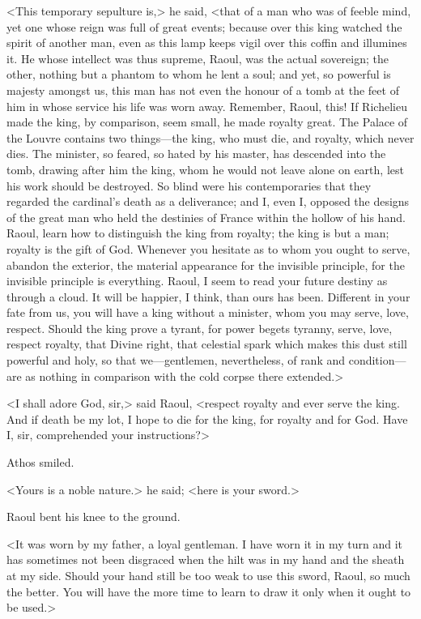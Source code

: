 <This temporary sepulture is,> he said, <that of a man who was of feeble mind, yet one whose reign was full of great events; because over this king watched the spirit of another man, even as this lamp keeps vigil over this coffin and illumines it. He whose intellect was thus supreme, Raoul, was the actual sovereign; the other, nothing but a phantom to whom he lent a soul; and yet, so powerful is majesty amongst us, this man has not even the honour of a tomb at the feet of him in whose service his life was worn away. Remember, Raoul, this! If Richelieu made the king, by comparison, seem small, he made royalty great. The Palace of the Louvre contains two things—the king, who must die, and royalty, which never dies. The minister, so feared, so hated by his master, has descended into the tomb, drawing after him the king, whom he would not leave alone on earth, lest his work should be destroyed. So blind were his contemporaries that they regarded the cardinal's death as a deliverance; and I, even I, opposed the designs of the great man who held the destinies of France within the hollow of his hand. Raoul, learn how to distinguish the king from royalty; the king is but a man; royalty is the gift of God. Whenever you hesitate as to whom you ought to serve, abandon the exterior, the material appearance for the invisible principle, for the invisible principle is everything. Raoul, I seem to read your future destiny as through a cloud. It will be happier, I think, than ours has been. Different in your fate from us, you will have a king without a minister, whom you may serve, love, respect. Should the king prove a tyrant, for power begets tyranny, serve, love, respect royalty, that Divine right, that celestial spark which makes this dust still powerful and holy, so that we—gentlemen, nevertheless, of rank and condition—are as nothing in comparison with the cold corpse there extended.>

<I shall adore God, sir,> said Raoul, <respect royalty and ever serve the king. And if death be my lot, I hope to die for the king, for royalty and for God. Have I, sir, comprehended your instructions?>

Athos smiled.

<Yours is a noble nature.> he said; <here is your sword.>

Raoul bent his knee to the ground.

<It was worn by my father, a loyal gentleman. I have worn it in my turn and it has sometimes not been disgraced when the hilt was in my hand and the sheath at my side. Should your hand still be too weak to use this sword, Raoul, so much the better. You will have the more time to learn to draw it only when it ought to be used.>

